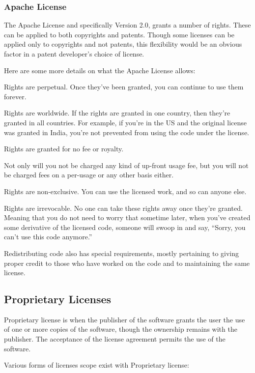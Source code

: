 \documentclass[12pt, onecolumn]{witseiepaper}
\begin{document}
\subsubsection{Apache License}
The Apache License and specifically Version 2.0, grants a number of rights.\cite{Apache} These can be applied to both copyrights and patents. Though some licenses can be applied only to copyrights and not patents, this flexibility would be an obvious factor in a patent developer’s choice of license.

Here are some more details on what the Apache License allows:

\textbullet \space Rights are perpetual.
Once they’ve been granted, you can continue to use them forever.

\textbullet	\space Rights are worldwide.
If the rights are granted in one country, then they’re granted in all countries. For example, if you’re in the US and the original license was granted in India, you’re not prevented from using the code under the license.

\textbullet \space Rights are granted for no fee or royalty.

Not only will you not be charged any kind of up-front usage fee, but you will not be charged fees on a per-usage or any other basis either.

\textbullet \space Rights are non-exclusive.
You can use the licensed work, and so can anyone else.

\textbullet \space Rights are irrevocable.
No one can take these rights away once they’re granted. Meaning that you do not need to worry that sometime later, when you’ve created some derivative of the licensed code, someone will swoop in and say, “Sorry, you can’t use this code anymore.”

Redistributing code also has special requirements, mostly pertaining to giving proper credit to those who have worked on the code and to maintaining the same license.

\subsection{Proprietary Licenses}

Proprietary license is when the publisher of the software grants the user the use of one or more copies of the software, though the ownership remains with the publisher.  The acceptance of the license agreement permits the use of the software.  

Various forms of licenses scope exist with Proprietary license:
\end{document}
